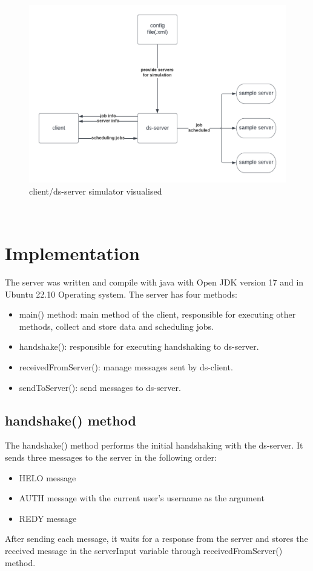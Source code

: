 \documentclass[a4paper]{article} %
\begin{document}
\begin{figure}[h!]
    \centering
    \includegraphics[scale = 0.3]{img/COMP3100 stage 1 diagram 2.png}
    \caption{client/ds-server simulator visualised}
    \label{fig:fig2}
\end{figure}\\

\section{Implementation}

The server was written and compile with java with Open JDK version 17 and in Ubuntu 22.10 Operating system. The server has four methods:
\begin{itemize}
    \item main() method: main method of the client, responsible for executing other methods, collect and store data and scheduling jobs.
    \item handshake(): responsible for executing handshaking to ds-server.
    \item receivedFromServer(): manage messages sent by ds-client.
    \item sendToServer(): send messages to ds-server.
\end{itemize}

\subsection{handshake() method}
The handshake() method performs the initial handshaking with the ds-server. It sends three messages to the server in the following order:
\begin{itemize}
    \item HELO message
    \item AUTH message with the current user's username as the argument
    \item REDY message
\end{itemize}
After sending each message, it waits for a response from the server and stores the received message in the serverInput variable through receivedFromServer() method.
\end{document}
